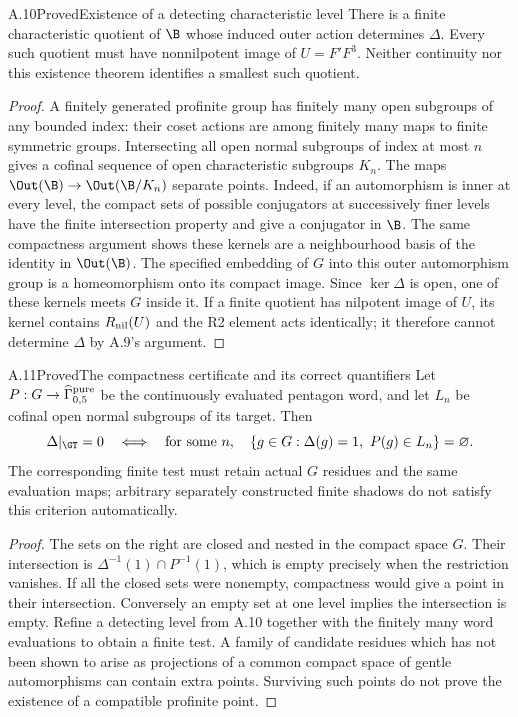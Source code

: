 \begin{statement}{A.10}{Proved}{Existence of a detecting characteristic level}
There is a finite characteristic quotient of $\B$ whose
induced outer action determines $\Delta$. Every such quotient
must have nonnilpotent image of $U=F'F^3$. Neither continuity
nor this existence theorem identifies a smallest such quotient.
\end{statement}
\begin{proof}
A finitely generated profinite group has finitely many open
subgroups of any bounded index: their coset actions are among
finitely many maps to finite symmetric groups. Intersecting all
open normal subgroups of index at most $n$ gives a cofinal
sequence of open characteristic subgroups $K_n$. The maps
$\Out(\B)\to\Out(\B/K_n)$ separate points. Indeed, if an
automorphism is inner at every level, the compact sets of
possible conjugators at successively finer levels have the
finite intersection property and give a conjugator in $\B$.
The same compactness argument shows these kernels are a
neighbourhood basis of the identity in $\Out(\B)$.
The specified embedding of $G$ into this outer automorphism
group is a homeomorphism onto its compact image. Since
$\ker\Delta$ is open, one of these kernels meets $G$ inside it.
If a finite quotient has nilpotent image of $U$, its kernel
contains $R_{\rm nil}(U)$ and the R2 element acts identically;
it therefore cannot determine $\Delta$ by A.9's argument.
\end{proof}

\begin{statement}{A.11}{Proved}{The compactness certificate and its correct quantifiers}
Let $P:G\to\widehat\Gamma_{0,5}^{\rm pure}$ be the continuously
evaluated pentagon word, and let $L_n$ be cofinal open normal
subgroups of its target. Then
\[
 \Delta|_{\GT}=0
 \quad\Longleftrightarrow\quad
 \text{for some }n,\quad
 \{g\in G:\Delta(g)=1,\ P(g)\in L_n\}=\varnothing.
\]
The corresponding finite test must retain actual $G$ residues
and the same evaluation maps; arbitrary separately constructed
finite shadows do not satisfy this criterion automatically.
\end{statement}
\begin{proof}
The sets on the right are closed and nested in the compact
space $G$. Their intersection is
$\Delta^{-1}(1)\cap P^{-1}(1)$, which is empty precisely
when the restriction vanishes. If all the closed sets were
nonempty, compactness would give a point in their intersection.
Conversely an empty set at one level implies the intersection
is empty. Refine a detecting level from A.10 together with
the finitely many word evaluations to obtain a finite test.
A family of candidate residues which has not been shown to
arise as projections of a common compact space of gentle
automorphisms can contain extra points. Surviving such points
do not prove the existence of a compatible profinite point.
\end{proof}

